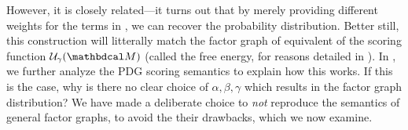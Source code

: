 {However, it is closely related---it turns out that by merely providing different weights for the terms in , we can recover the probability distribution. Better still, this construction will litterally match the factor graph of equivalent of the scoring function $\mathcal U_\gamma(\dg M)$ (called the free energy, for reasons detailed in ).
%
	In , we further analyze the PDG scoring semantics to explain how this works.
	If this is the case, why is there no clear choice of $\alpha,\beta,\gamma$ which results in the factor graph distribution?  
	We have made a deliberate choice to \emph{not} reproduce the semantics of general factor graphs, to avoid the their drawbacks, which 
	we now examine.





%		
%		

}
